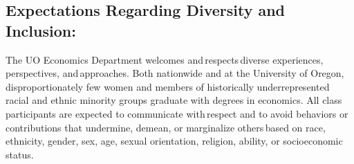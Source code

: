\subsection*{Expectations Regarding Diversity and Inclusion:}
  The UO Economics Department welcomes and respects diverse experiences, perspectives, and approaches. Both nationwide and at the University of Oregon, disproportionately few women and members of historically underrepresented racial and ethnic minority groups graduate with degrees in economics. All class participants are expected to communicate with respect and to avoid behaviors or contributions that undermine, demean, or marginalize others based on race, ethnicity, gender, sex, age, sexual orientation, religion, ability, or socioeconomic status.

